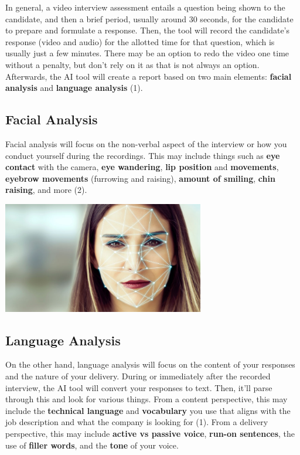 \documentclass[
]{book}
\begin{document}
In general, a video interview assessment entails a question being shown to the candidate, and then a brief period, usually around 30 seconds, for the candidate to prepare and formulate a response. Then, the tool will record the candidate's response (video and audio) for the allotted time for that question, which is usually just a few minutes. There may be an option to redo the video one time without a penalty, but don't rely on it as that is not always an option. Afterwards, the AI tool will create a report based on two main elements: \textbf{facial analysis} and \textbf{language analysis} (1).~

\hypertarget{facial-analysis}{%
\subsection{Facial Analysis}\label{facial-analysis}}

Facial analysis will focus on the non-verbal aspect of the interview or how you conduct yourself during the recordings. This may include things such as \textbf{eye contact} with the camera, \textbf{eye wandering}, \textbf{lip position} and \textbf{movements}, \textbf{eyebrow movements} (furrowing and raising), \textbf{amount of smiling}, \textbf{chin raising}, and more (2).

\includegraphics[width=3.46875in,height=\textheight]{Facial_Analysis.png}

\hypertarget{language-analysis}{%
\subsection{Language Analysis}\label{language-analysis}}

On the other hand, language analysis will focus on the content of your responses and the nature of your delivery. During or immediately after the recorded interview, the AI tool will convert your responses to text. Then, it'll parse through this and look for various things. From a content perspective, this may include the \textbf{technical language} and \textbf{vocabulary} you use that aligns with the job description and what the company is looking for (1). From a delivery perspective, this may include \textbf{active vs passive voice}, \textbf{run-on sentences}, the use of \textbf{filler words}, and the \textbf{tone} of your voice.
\end{document}
